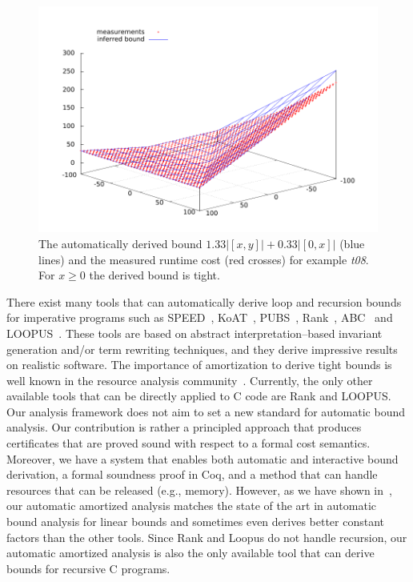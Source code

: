 \documentclass[nocopyrightspace,preprint]{sigplanconf}
\newcommand{\pref}[1]{\prettyref{#1}}
\begin{document}
\begin{figure}[t]
\center
\includegraphics[width=.9\linewidth]{fig/bound3d}
\caption{The automatically derived bound $1.33|[x,y]| + 0.33 |[0,x]|$
  (blue lines) and the measured runtime cost (red crosses) for example
  \emph{t08}. For $x\ge 0$ the derived bound is tight.}
\label{fig:3d}
\end{figure}

There exist many tools that can automatically derive loop and
recursion bounds for imperative programs such as
SPEED~\cite{GulwaniMC09,GulwaniZ10}, KoAT~\cite{BrockschmidtEFFG14},
PUBS~\cite{AlbertAGPZ12}, Rank~\cite{AliasDFG10},
ABC~\cite{BlancHHK10} and LOOPUS~\cite{Zuleger11,SinnZV14}.  These
tools are based on abstract interpretation--based invariant generation
and/or term rewriting techniques, and they derive impressive results
on realistic software.  The importance of amortization to derive tight
bounds is well known in the resource analysis
community~\cite{AlonsoG12,Moser14,SinnZV14}.  Currently, the only
other available tools that can be directly applied to C code are Rank
and LOOPUS.  Our analysis framework does not aim to set a new standard
for automatic bound analysis.  Our contribution is rather a principled
approach that produces certificates that are proved sound with respect
to a formal cost semantics.  Moreover, we have a system that enables
both automatic and interactive bound derivation, a formal soundness
proof in Coq, and a method that can handle resources that can be
released (e.g., memory).  However, as we have shown
in~\pref{sec:exper}, our automatic amortized analysis matches the
state of the art in automatic bound analysis for linear bounds and
sometimes even derives better constant factors than the other tools.
Since Rank and Loopus do not handle recursion, our automatic amortized
analysis is also the only available tool that can derive bounds for
recursive C programs.
\end{document}
